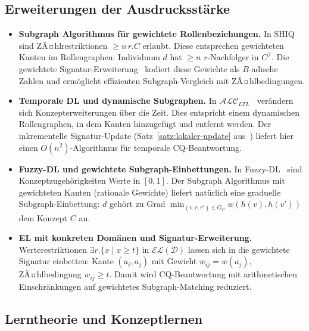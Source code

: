 ﻿\documentclass[a4paper,12pt]{article}
\theoremstyle{definition}
\theoremstyle{plain}
\theoremstyle{remark}
\newcommand{\interp}[1]{\ensuremath{\mathcal{#1}}}
\begin{document}
\subsection{Erweiterungen der Ausdrucksst{\"a}rke}

\begin{itemize}
  \item \textbf{Subgraph Algorithmus f{\"u}r gewichtete Rollenbeziehungen.}
        In \textsf{SHIQ} sind ZÃ¤hlrestriktionen $\geq n\,r.C$ erlaubt.
        Diese entsprechen gewichteten Kanten im Rollengraphen:
        Individuum $d$ hat $\geq n$ $r$-Nachfolger in $C^\interp{I}$.
        Die gewichtete Signatur-Erweiterung~\cite{Epp2026ext}
        kodiert diese Gewichte als $B$-adische Zahlen und
        erm{\"o}glicht effizienten Subgraph-Vergleich mit ZÃ¤hlbedingungen.

  \item \textbf{Temporale DL und dynamische Subgraphen.}
        In $\mathcal{ALC}_{LTL}$~\cite{Artale2001} ver{\"a}ndern sich
        Konzepterweiterungen {\"u}ber die Zeit.
        Dies entspricht einem dynamischen Rollengraphen, in dem
        Kanten hinzugef{\"u}gt und entfernt werden.
        Der inkrementelle Signatur-Update (Satz~\ref{satz:lokaler-update}
        aus~\cite{Epp2026ext}) liefert hier einen $O(n^2)$-Algorithmus
        f{\"u}r temporale CQ-Beantwortung.

  \item \textbf{Fuzzy-DL und gewichtete Subgraph-Einbettungen.}
        In Fuzzy-DL~\cite{Straccia2001} sind Konzeptzugeh{\"o}rigkeiten
        Werte in $[0,1]$.
        Der Subgraph Algorithmus mit gewichteten Kanten
        (rationale Gewichte) liefert nat{\"u}rlich eine
        graduelle Subgraph-Einbettung: $d$ geh{\"o}rt zu Grad
        $\min_{(v,r,v') \in G_C} w(h(v), h(v'))$ dem Konzept $C$ an.

  \item \textbf{EL mit konkreten Dom{\"a}nen und Signatur-Erweiterung.}
        Werterestriktionen $\exists r.\{x \mid x \geq t\}$ in
        $\mathcal{EL}(\mathcal{D})$ lassen sich in die gewichtete
        Signatur einbetten: Kante $(a_i, a_j)$ mit Gewicht $w_{ij} = w(a_j)$,
        ZÃ¤hlbedingung $w_{ij} \geq t$.
        Damit wird CQ-Beantwortung mit arithmetischen Einschr{\"a}nkungen
        auf gewichtetes Subgraph-Matching reduziert.
\end{itemize}

\subsection{Lerntheorie und Konzeptlernen}
\end{document}
